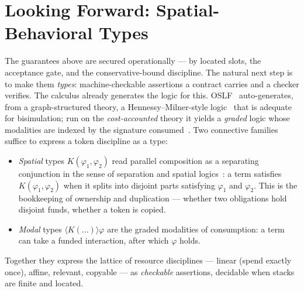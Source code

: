 \documentclass[11pt]{article}
\theoremstyle{definition}
\theoremstyle{plain}
\begin{document}
\section{Looking Forward: Spatial-Behavioral Types}\label{sec:types}

The guarantees above are secured operationally --- by located slots, the acceptance gate, and the
conservative-bound discipline. The natural next step is to make them \emph{types}: machine-checkable
assertions a contract carries and a checker verifies. The calculus already generates the logic for
this. OSLF~\cite{MeredithRadestock2005b} auto-generates, from a graph-structured theory, a
Hennessy--Milner-style logic~\cite{HennessyMilner1985} that is adequate for bisimulation; run on the
\emph{cost-accounted} theory it yields a \emph{graded} logic whose modalities are indexed by the
signature consumed~\cite[\S7,\S11]{CGC2026}. Two connective families suffice to express a token
discipline as a type:
\begin{itemize}[leftmargin=1.4em,itemsep=2pt]
\item \emph{Spatial} types $K(\varphi_1,\varphi_2)$ read parallel composition as a separating
conjunction in the sense of separation and spatial
logics~\cite{OHearn2001,Reynolds2002,CairesCardelli2003}: a term satisfies $K(\varphi_1,\varphi_2)$
when it splits into disjoint parts satisfying $\varphi_1$ and $\varphi_2$. This is the bookkeeping of
ownership and duplication --- whether two obligations hold disjoint funds, whether a token is copied.
\item \emph{Modal} types $\langle K(\dots)\rangle\varphi$ are the graded modalities of consumption: a
term can take a funded interaction, after which $\varphi$ holds.
\end{itemize}
Together they express the lattice of resource disciplines --- linear (spend exactly once), affine,
relevant, copyable --- as \emph{checkable} assertions, decidable when stacks are finite and located.
\end{document}
